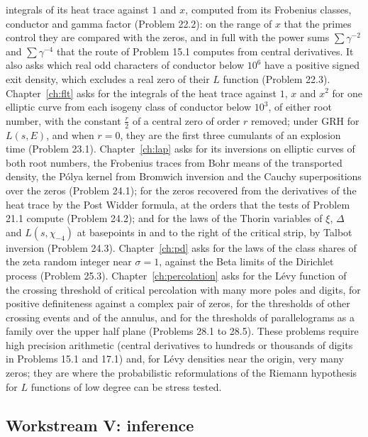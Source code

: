integrals of its heat trace against $1$ and $x$, computed from its Frobenius classes, conductor and gamma factor (Problem 22.2): on the range of $x$ that the primes control they are compared with the zeros, and in full with the power sums $\sum\gamma^{-2}$ and $\sum\gamma^{-4}$ that the route of Problem 15.1 computes from central derivatives. It also asks which real odd characters of conductor below $10^6$ have a positive signed exit density, which excludes a real zero of their $L$ function (Problem 22.3). Chapter~\ref{ch:flt} asks for the integrals of the heat trace against $1$, $x$ and $x^2$ for one elliptic curve from each isogeny class of conductor below $10^3$, of either root number, with the constant $\frac r2$ of a central zero of order $r$ removed; under GRH for $L(s,E)$, and when $r=0$, they are the first three cumulants of an explosion time (Problem 23.1). Chapter~\ref{ch:lap} asks for its inversions on elliptic curves of both root numbers, the Frobenius traces from Bohr means of the transported density, the P\'olya kernel from Bromwich inversion and the Cauchy superpositions over the zeros (Problem 24.1); for the zeros recovered from the derivatives of the heat trace by the Post Widder formula, at the orders that the tests of Problem 21.1 compute (Problem 24.2); and for the laws of the Thorin variables of $\xi$, $\Delta$ and $L(s,\chi_{-4})$ at basepoints in and to the right of the critical strip, by Talbot inversion (Problem 24.3). Chapter~\ref{ch:pd} asks for the laws of the class shares of the zeta random integer near $\sigma=1$, against the Beta limits of the Dirichlet process (Problem 25.3). Chapter~\ref{ch:percolation} asks for the L\'evy function of the crossing threshold of critical percolation with many more poles and digits, for positive definiteness against a complex pair of zeros, for the thresholds of other crossing events and of the annulus, and for the thresholds of parallelograms as a family over the upper half plane (Problems 28.1 to 28.5). These problems require high precision arithmetic (central derivatives to hundreds or thousands of digits in Problems 15.1 and 17.1) and, for Lévy densities near the origin, very many zeros; they are where the probabilistic reformulations of the Riemann hypothesis for $L$ functions of low degree can be stress tested.

\subsection{Workstream V: inference}

